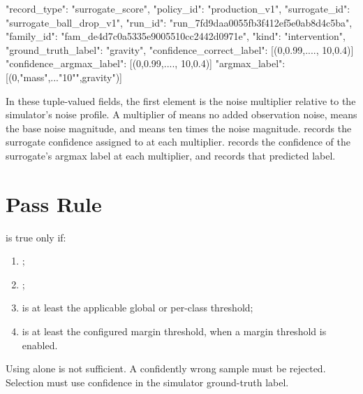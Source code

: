 \documentclass[11pt]{article}
\begin{document}
\begin{DocCode}
{
  "record_type": "surrogate_score",
  "policy_id": "production_v1",
  "surrogate_id": "surrogate_ball_drop_v1",
  "run_id": "run_7fd9daa0055fb3f412ef5e0ab8d4c5ba",
  "family_id": "fam_de4d7c0a5335e9005510cc2442d0971e",
  "kind": "intervention",
  "ground_truth_label": "gravity",
  "confidence_correct_label": [(0,0.99,...., 10,0.4)]
  "confidence_argmax_label": [(0,0.99,...., 10,0.4)]
  "argmax_label":[(0,"mass",..."10"",gravity")]
}
\end{DocCode}

In these tuple-valued fields, the first element is the noise multiplier relative to the simulator's  noise profile.
A multiplier of  means no added observation noise,  means the base  noise magnitude, and  means ten times the  noise magnitude.
 records the surrogate confidence assigned to  at each multiplier.
 records the confidence of the surrogate's argmax label at each multiplier, and  records that predicted label.

\section*{Pass Rule}

 is true only if:

\begin{enumerate}
\item {};
\item {};
\item {} is at least the applicable global or per-class threshold;
\item {} is at least the configured margin threshold, when a margin threshold is enabled.
\end{enumerate}

Using  alone is not sufficient.
A confidently wrong sample must be rejected.
Selection must use confidence in the simulator ground-truth label.
\end{document}
